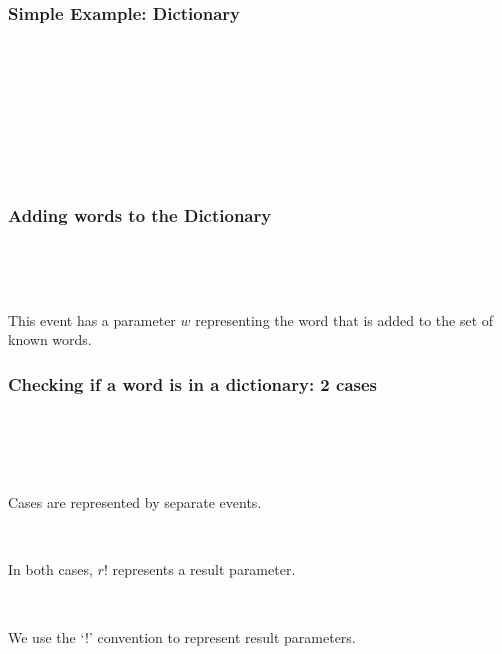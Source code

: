 \documentclass{beamer}
\begin{document}
\begin{frame}


\frametitle{Simple Example: Dictionary }

\ENDC\\

~

~


~


~



\end{frame}




\begin{frame}

\frametitle{Adding  words to the Dictionary }

\operations
{}

~

~

This event has a \alert{parameter} $w$ representing the word that is added to the set of known words.

\end{frame}




\begin{frame}

\frametitle{Checking if a word is in a dictionary: 2 cases }



\begin{columns}
\begin{column}{2in}
\end{column}
\begin{column}{2in}
\end{column}
\end{columns}

~

~

Cases are represented by \alert{separate events}.

~

In both cases, $r!$ represents a \alert{result parameter}.

~

We use the `!' convention to represent result parameters.




\end{frame}
\end{document}
